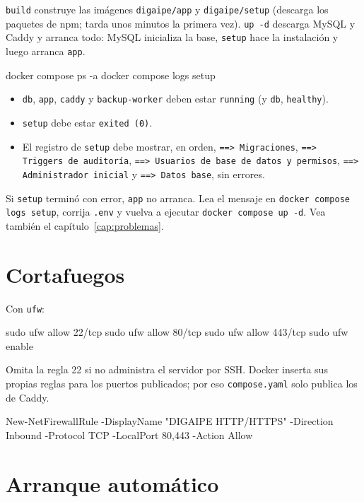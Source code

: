 \texttt{build} construye las imágenes \texttt{digaipe/app} y \texttt{digaipe/setup} (descarga
los paquetes de npm; tarda unos minutos la primera vez). \texttt{up -d} descarga MySQL y Caddy y
arranca todo: MySQL inicializa la base, \texttt{setup} hace la instalación y luego arranca
\texttt{app}.

\begin{comprobar}
	\begin{codigo}
docker compose ps -a
docker compose logs setup
	\end{codigo}
	\begin{itemize}
		\item \texttt{db}, \texttt{app}, \texttt{caddy} y \texttt{backup-worker} deben estar
		      \texttt{running} (y \texttt{db}, \texttt{healthy}).
		\item \texttt{setup} debe estar \texttt{exited (0)}.
		\item El registro de \texttt{setup} debe mostrar, en orden, \texttt{==> Migraciones},
		      \texttt{==> Triggers de auditoría}, \texttt{==> Usuarios de base de datos y permisos},
		      \texttt{==> Administrador inicial} y \texttt{==> Datos base}, sin errores.
	\end{itemize}
\end{comprobar}

Si \texttt{setup} terminó con error, \texttt{app} no arranca. Lea el mensaje en
\texttt{docker compose logs setup}, corrija \texttt{.env} y vuelva a ejecutar
\texttt{docker compose up -d}. Vea también el capítulo~\ref{cap:problemas}.

\section{Cortafuegos}

 Con \texttt{ufw}:
\begin{codigo}
sudo ufw allow 22/tcp
sudo ufw allow 80/tcp
sudo ufw allow 443/tcp
sudo ufw enable
\end{codigo}
Omita la regla 22 si no administra el servidor por SSH. Docker inserta sus propias reglas para
los puertos publicados; por eso \texttt{compose.yaml} solo publica los de Caddy.

\begin{codigo}
New-NetFirewallRule -DisplayName "DIGAIPE HTTP/HTTPS" -Direction Inbound -Protocol TCP -LocalPort 80,443 -Action Allow
\end{codigo}

\section{Arranque automático}

